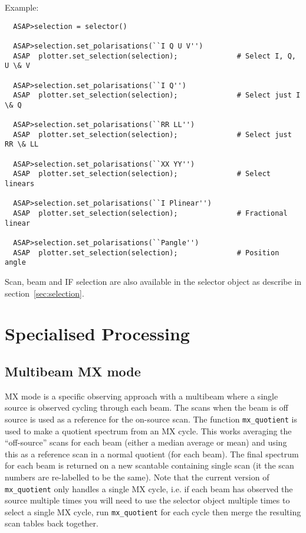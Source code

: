\documentclass[11pt]{article}
\newcommand{\cmd}[1]{{\tt #1}}
\begin{document}
Example:

\begin{verbatim}
  ASAP>selection = selector()

  ASAP>selection.set_polarisations(``I Q U V'')
  ASAP  plotter.set_selection(selection);              # Select I, Q, U \& V

  ASAP>selection.set_polarisations(``I Q'')
  ASAP  plotter.set_selection(selection);              # Select just I \& Q

  ASAP>selection.set_polarisations(``RR LL'')
  ASAP  plotter.set_selection(selection);              # Select just RR \& LL

  ASAP>selection.set_polarisations(``XX YY'')
  ASAP  plotter.set_selection(selection);              # Select linears

  ASAP>selection.set_polarisations(``I Plinear'')
  ASAP  plotter.set_selection(selection);              # Fractional linear

  ASAP>selection.set_polarisations(``Pangle'')
  ASAP  plotter.set_selection(selection);              # Position angle

\end{verbatim}

Scan, beam and IF selection are also available in the selector object as
describe in section~\ref{sec:selection}.

\section{Specialised Processing}

\subsection{Multibeam MX mode}

MX mode is a specific observing approach with a multibeam where a
single source is observed cycling through each beam. The scans when
the beam is off source is used as a reference for the on-source
scan. The function \cmd{mx\_quotient} is used to make a quotient
spectrum from an MX cycle. This works averaging the ``off-source''
scans for each beam (either a median average or mean) and using this
as a reference scan in a normal quotient (for each beam). The final
spectrum for each beam is returned on a new scantable containing
single scan (it the scan numbers are re-labelled to be the same). Note
that the current version of \cmd{mx\_quotient} only handles a single
MX cycle, i.e. if each beam has observed the source multiple times you
will need to use the selector object multiple times to select a single
MX cycle, run \cmd{mx\_quotient} for each cycle then merge the
resulting scan tables back together.
\end{document}
